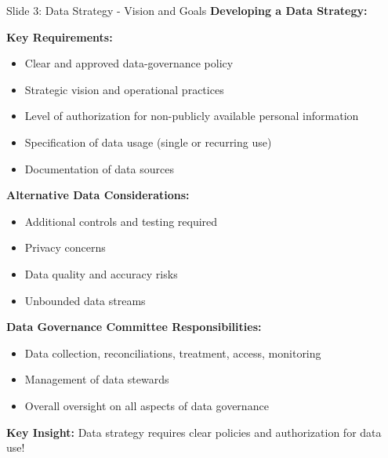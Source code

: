 \documentclass[8pt]{beamer}
\begin{document}
	\begin{frame}{Slide 3: Data Strategy - Vision and Goals}
		\fontsize{6.5}{7.5}\selectfont
		\textbf{Developing a Data Strategy:}
		
		\vspace{0.1cm}
		\textbf{Key Requirements:}
		\begin{itemize}
			\item Clear and approved data-governance policy
			\item Strategic vision and operational practices
			\item Level of authorization for non-publicly available personal information
			\item Specification of data usage (single or recurring use)
			\item Documentation of data sources
		\end{itemize}
		
		\vspace{0.1cm}
		\textbf{Alternative Data Considerations:}
		\begin{itemize}
			\item Additional controls and testing required
			\item Privacy concerns
			\item Data quality and accuracy risks
			\item Unbounded data streams
		\end{itemize}
		
		\vspace{0.1cm}
		\textbf{Data Governance Committee Responsibilities:}
		\begin{itemize}
			\item Data collection, reconciliations, treatment, access, monitoring
			\item Management of data stewards
			\item Overall oversight on all aspects of data governance
		\end{itemize}
		
		\textcolor{myblue}{\textbf{Key Insight:}} Data strategy requires \textcolor{myblue}{clear policies and authorization} for data use!
	\end{frame}
	
\end{document}
